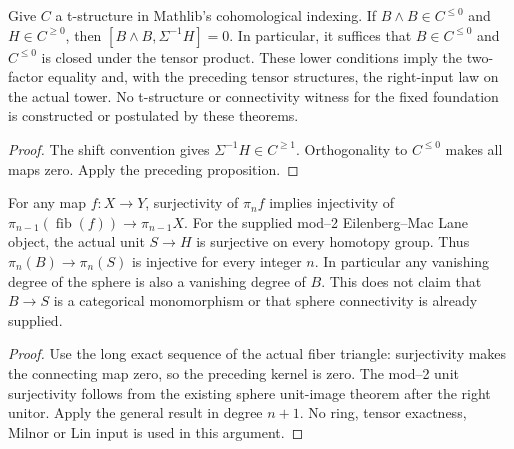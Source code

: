 \begin{proposition}
  \label{prop:h6-unit-fiber-commutes-from-connectivity}
  \leanok
  Give $C$ a t-structure in Mathlib's cohomological indexing. If
  $B\wedge B\in C^{\le0}$ and $H\in C^{\ge0}$, then
  $[B\wedge B,\Sigma^{-1}H]=0$. In particular, it suffices that
  $B\in C^{\le0}$ and $C^{\le0}$ is closed under the tensor product.
  These lower conditions imply the two-factor equality and, with the
  preceding tensor structures, the right-input law on the actual tower.
  No t-structure or connectivity witness for the fixed foundation is
  constructed or postulated by these theorems.
\end{proposition}
\begin{proof}
  The shift convention gives $\Sigma^{-1}H\in C^{\ge1}$. Orthogonality
  to $C^{\le0}$ makes all maps zero. Apply the preceding proposition.
  \leanok
\end{proof}

\begin{proposition}
  \label{prop:h6-unit-fiber-homotopy-injective}
  \leanok
  For any map $f:X\to Y$, surjectivity of $\pi_nf$ implies injectivity of
  $\pi_{n-1}(\operatorname{fib}(f))\to\pi_{n-1}X$.
  For the supplied mod--2 Eilenberg--Mac Lane object, the actual unit
  $S\to H$ is surjective on every homotopy group. Thus
  $\pi_n(B)\to\pi_n(S)$ is injective for every integer $n$.
  In particular any vanishing degree of the sphere is also a vanishing
  degree of $B$. This does not claim that $B\to S$ is a categorical
  monomorphism or that sphere connectivity is already supplied.
\end{proposition}
\begin{proof}
  Use the long exact sequence of the actual fiber triangle: surjectivity
  makes the connecting map zero, so the preceding kernel is zero.
  The mod--2 unit surjectivity follows from the existing sphere unit-image
  theorem after the right unitor. Apply the general result in degree $n+1$.
  No ring, tensor exactness, Milnor or Lin input is used in this argument.
  \leanok
\end{proof}

